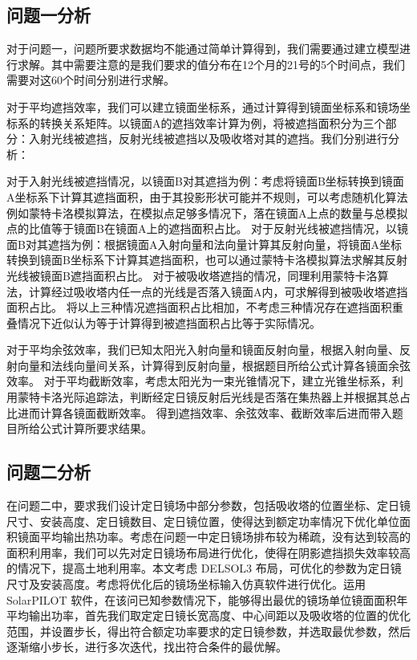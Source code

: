 \documentclass[withoutpreface,bwprint]{cumcmthesis} %
\begin{document}
\subsection{问题一分析}
对于问题一，问题所要求数据均不能通过简单计算得到，我们需要通过建立模型进行求解。其中需要注意的是我们要求的值分布在12个月的21号的5个时间点，我们需要对这60个时间分别进行求解。

对于平均遮挡效率，我们可以建立镜面坐标系，通过计算得到镜面坐标系和镜场坐标系的转换关系矩阵。以镜面A的遮挡效率计算为例，将被遮挡面积分为三个部分：入射光线被遮挡，反射光线被遮挡以及吸收塔对其的遮挡。我们分别进行分析：

对于入射光线被遮挡情况，以镜面B对其遮挡为例：考虑将镜面B坐标转换到镜面A坐标系下计算其遮挡面积，由于其投影形状可能并不规则，可以考虑随机化算法例如蒙特卡洛模拟算法，在模拟点足够多情况下，落在镜面A上点的数量与总模拟点的比值等于镜面B在镜面A上的遮挡面积占比。
对于反射光线被遮挡情况，以镜面B对其遮挡为例：根据镜面A入射向量和法向量计算其反射向量，将镜面A坐标转换到镜面B坐标系下计算其遮挡面积，也可以通过蒙特卡洛模拟算法求解其反射光线被镜面B遮挡面积占比。
对于被吸收塔遮挡的情况，同理利用蒙特卡洛算法，计算经过吸收塔内任一点的光线是否落入镜面A内，可求解得到被吸收塔遮挡面积占比。
将以上三种情况遮挡面积占比相加，不考虑三种情况存在遮挡面积重叠情况下近似认为等于计算得到被遮挡面积占比等于实际情况。

对于平均余弦效率，我们已知太阳光入射向量和镜面反射向量，根据入射向量、反射向量和法线向量间关系，计算得到反射向量，根据题目所给公式计算各镜面余弦效率。
对于平均截断效率，考虑太阳光为一束光锥情况下，建立光锥坐标系，利用蒙特卡洛光际追踪法，判断经定日镜反射后光线是否落在集热器上并根据其总占比进而计算各镜面截断效率。
得到遮挡效率、余弦效率、截断效率后进而带入题目所给公式计算所要求结果。
\subsection{问题二分析}
在问题二中，要求我们设计定日镜场中部分参数，包括吸收塔的位置坐标、定日镜尺寸、安装高度、定日镜数目、定日镜位置，使得达到额定功率情况下优化单位面积镜面平均输出热功率。考虑在问题一中定日镜场排布较为稀疏，没有达到较高的面积利用率，我们可以先对定日镜场布局进行优化，使得在阴影遮挡损失效率较高的情况下，提高土地利用率。本文考虑 DELSOL3 布局，可优化的参数为定日镜尺寸及安装高度。考虑将优化后的镜场坐标输入仿真软件进行优化。运用SolarPILOT 软件，在该问已知参数情况下，能够得出最优的镜场单位镜面面积年平均输出功率，首先我们取定定日镜长宽高度、中心间距以及吸收塔的位置的优化范围，并设置步长，得出符合额定功率要求的定日镜参数，并选取最优参数，然后逐渐缩小步长，进行多次迭代，找出符合条件的最优解。
\end{document}
